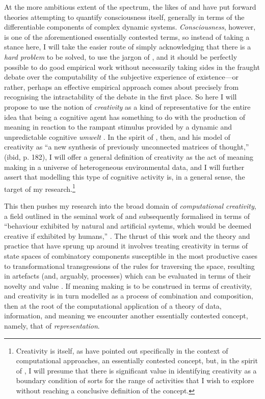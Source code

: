 At the more ambitious extent of the spectrum, the likes of \cite{Koch2004} and \cite{Tononi2008} have put forward theories attempting to quantify consciousness itself, generally in terms of the differentiable components of complex dynamic systems.  \emph{Consciousness}, however, is one of the aforementioned essentially contested terms, so instead of taking a stance here, I will take the easier route of simply acknowledging that there is a \emph{hard problem} to be solved, to use the jargon of \cite{Chalmers1996}, and it should be perfectly possible to do good empirical work without necessarily taking sides in the fraught debate over the computability of the subjective experience of existence---or rather, perhaps an effective empirical approach comes about precisely from recognising the intractability of the debate in the first place.  So here I will propose to use the notion of \emph{creativity} as a kind of representative for the entire idea that being a cognitive agent has something to do with the production of meaning in reaction to the rampant stimulus provided by a dynamic and unpredictable cognitive \emph{umwelt} \citep{VonUexkull1957}.  In the spirit of \cite{Koestler1964}, then, and his model of creativity as ``a new synthesis of previously unconnected matrices of thought,'' (ibid, p. 182), I will offer a general definition of creativity as the act of meaning making in a universe of heterogeneous environmental data, and I will further assert that modelling this type of cognitive activity is, in a general sense, the target of my research.\footnote{Creativity is itself, as \cite{ColtonEA2014} have pointed out specifically in the context of computational approaches, an essentially contested concept, but, in the spirit of \cite{Gallie1956}, I will presume that there is significant value in identifying creativity as a boundary condition of sorts for the range of activities that I wish to explore without reaching a conclusive definition of the concept.}

This then pushes my research into the broad domain of \emph{computational creativity}, a field outlined in the seminal work of \cite{Boden1990} and subsequently formalised in terms of ``behaviour  exhibited  by  natural  and artificial systems, which would be deemed creative if exhibited by humans,'' \citep[][p. 206]{Wiggins2006b}.  The thrust of this work and the theory and practice that have sprung up around it involves treating creativity in terms of state spaces of combinatory components susceptible in the most productive cases to transformational transgressions of the rules for traversing the space, resulting in artefacts (and, arguably, processes) which can be evaluated in terms of their novelty and value \citep[see][among others for interesting theoretical work on the evaluation of computational creativity]{Ritchie2007,Colton2008,Jordanous2012}.  If meaning making is to be construed in terms of creativity, and creativity is in turn modelled as a process of combination and composition, then at the root of the computational application of a theory of data, information, and meaning we encounter another essentially contested concept, namely, that of \emph{representation}.

